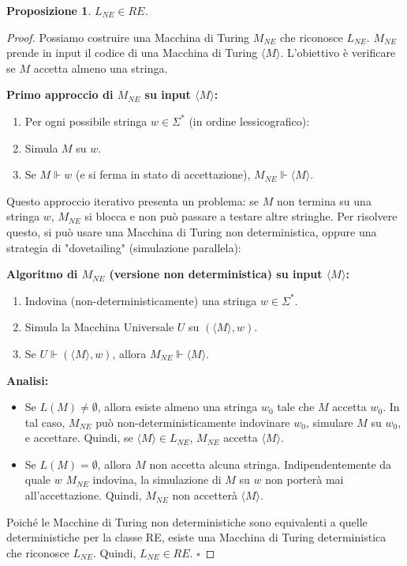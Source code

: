 \documentclass[a4paper]{article}
\newcommand{\blankS}{\ensuremath{\square}}
\newtheorem{proposition}[theorem]{Proposizione}
\begin{document}
\begin{proposition}
$L_{NE} \in RE$.
\end{proposition}
\begin{proof}
Possiamo costruire una Macchina di Turing $M_{NE}$ che riconosce $L_{NE}$. $M_{NE}$ prende in input il codice di una Macchina di Turing $\langle M \rangle$. L'obiettivo è verificare se $M$ accetta almeno una stringa.

\textbf{Primo approccio di $M_{NE}$ su input $\langle M \rangle$:}
\begin{enumerate}
    \item Per ogni possibile stringa $w \in \Sigma^*$ (in ordine lessicografico):
    \item Simula $M$ su $w$.
    \item Se $M \Vdash w$ (e si ferma in stato di accettazione), $M_{NE} \Vdash \langle M \rangle$.
\end{enumerate}

Questo approccio iterativo presenta un problema: se $M$ non termina su una stringa $w$, $M_{NE}$ si blocca e non può passare a testare altre stringhe.
Per risolvere questo, si può usare una Macchina di Turing non deterministica, oppure una strategia di "dovetailing" (simulazione parallela):

\textbf{Algoritmo di $M_{NE}$ (versione non deterministica) su input $\langle M \rangle$:}
\begin{enumerate}
    \item Indovina (non-deterministicamente) una stringa $w \in \Sigma^*$.
    \item Simula la Macchina Universale $U$ su $(\langle M \rangle, w)$.
    \item Se $U \Vdash (\langle M \rangle, w)$, allora $M_{NE} \Vdash \langle M \rangle$.
\end{enumerate}

\textbf{Analisi:}
\begin{itemize}
    \item Se $L(M) \neq \emptyset$, allora esiste almeno una stringa $w_0$ tale che $M$ accetta $w_0$. In tal caso, $M_{NE}$ può non-deterministicamente indovinare $w_0$, simulare $M$ su $w_0$, e accettare. Quindi, se $\langle M \rangle \in L_{NE}$, $M_{NE}$ accetta $\langle M \rangle$.
    \item Se $L(M) = \emptyset$, allora $M$ non accetta alcuna stringa. Indipendentemente da quale $w$ $M_{NE}$ indovina, la simulazione di $M$ su $w$ non porterà mai all'accettazione. Quindi, $M_{NE}$ non accetterà $\langle M \rangle$.
\end{itemize}
Poiché le Macchine di Turing non deterministiche sono equivalenti a quelle deterministiche per la classe RE, esiste una Macchina di Turing deterministica che riconosce $L_{NE}$. Quindi, $L_{NE} \in RE$.
$\blankS$
\end{proof}
\end{document}
